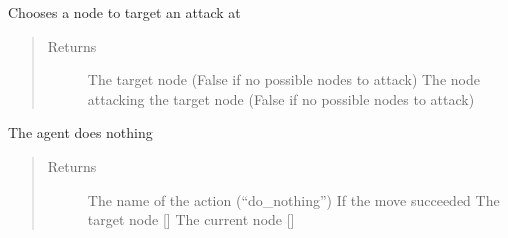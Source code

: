 \documentclass[letterpaper,10pt,english]{sphinxmanual}
\begin{document}
\begin{fulllineitems}
\begin{fulllineitems}
\label{\detokenize{source/yawning_titan.envs.generic.core:yawning_titan.envs.generic.core.red_action_set.RedActionSet.choose_target_node}}
\sphinxAtStartPar
Chooses a node to target an attack at
\begin{quote}\begin{description}
\item[{Returns}] \leavevmode
\sphinxAtStartPar
The target node (False if no possible nodes to attack)
The node attacking the target node (False if no possible nodes to attack)

\end{description}\end{quote}

\end{fulllineitems}


\begin{fulllineitems}
\label{\detokenize{source/yawning_titan.envs.generic.core:yawning_titan.envs.generic.core.red_action_set.RedActionSet.do_nothing}}
\sphinxAtStartPar
The agent does nothing
\begin{quote}\begin{description}
\item[{Returns}] \leavevmode
\sphinxAtStartPar
The name of the action (“do\_nothing”)
If the move succeeded
The target node {[}{]}
The current node {[}{]}

\end{description}\end{quote}

\end{fulllineitems}


\end{fulllineitems}
\end{document}
